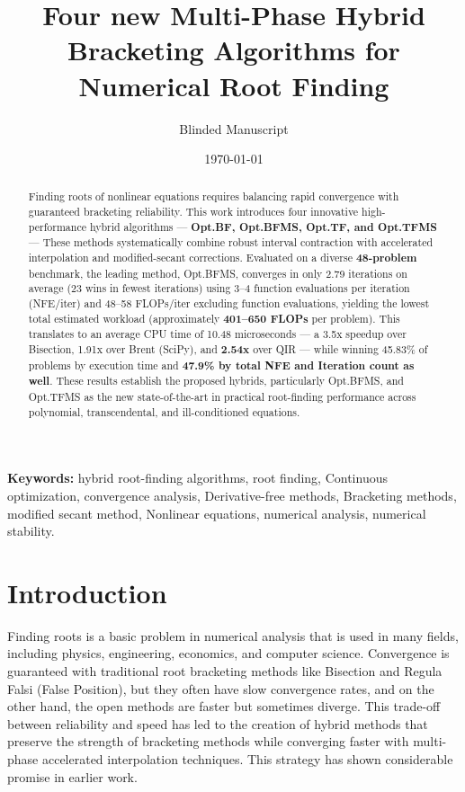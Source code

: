 \documentclass[amsmath, amssymb, aps]{revtex4-2}
\begin{document}
\pagestyle{plain}

\title{Four new Multi-Phase Hybrid Bracketing Algorithms for Numerical Root Finding }

\author{Blinded Manuscript}

\date{\today}


\begin{abstract}
Finding roots of nonlinear equations requires balancing rapid convergence with guaranteed bracketing reliability. This work introduces four innovative high-performance hybrid algorithms — \textbf{Opt.BF, Opt.BFMS, Opt.TF, and Opt.TFMS} — These methods systematically combine robust interval contraction with accelerated interpolation and modified-secant corrections. Evaluated on a diverse \textbf{48-problem} benchmark, the leading method, Opt.BFMS, converges in only 2.79 iterations on average (23 wins in fewest iterations) using 3–4 function evaluations per iteration (NFE/iter) and 48–58 FLOPs/iter excluding function evaluations, yielding the lowest total estimated workload (approximately \textbf{401–650 FLOPs} per problem). This translates to an average CPU time of 10.48 microseconds — a 3.5x speedup over Bisection, 1.91x over Brent (SciPy), and \textbf{2.54x} over QIR — while winning 45.83\% of problems by execution time and \textbf{47.9\% by total NFE and Iteration count as well}. These results establish the proposed hybrids, particularly Opt.BFMS, and Opt.TFMS as the new state-of-the-art in practical root-finding performance across polynomial, transcendental, and ill-conditioned equations.
\end{abstract}

\maketitle

\noindent\textbf{Keywords:} hybrid root-finding algorithms, root finding, Continuous optimization, convergence analysis, Derivative-free methods, Bracketing methods, modified secant method, Nonlinear equations, numerical analysis, numerical stability.

\section{Introduction}

Finding roots is a basic problem in numerical analysis that is used in many fields, including physics, engineering, economics, and computer science. Convergence is guaranteed with traditional root bracketing methods like Bisection and Regula Falsi (False Position), but they often have slow convergence rates, and on the other hand, the open methods are faster but sometimes diverge. This trade-off between reliability and speed has led to the creation of hybrid methods that preserve the strength of bracketing methods while converging faster with multi-phase accelerated interpolation techniques. This strategy has shown considerable promise in earlier work. 
\end{document}
